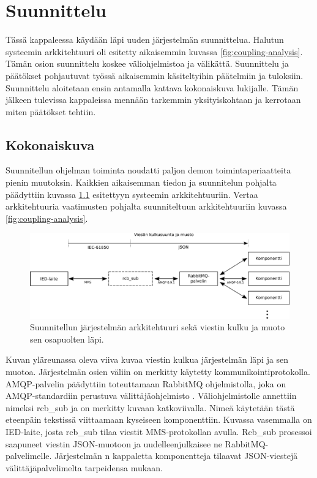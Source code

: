 \chapter{Suunnittelu}
\label{ch:suunnittelu}
Tässä kappaleessa käydään läpi uuden järjestelmän suunnittelua. Halutun systeemin arkkitehtuuri oli esitetty aikaisemmin kuvassa \ref{fig:coupling-analysis}. Tämän osion suunnittelu koskee väliohjelmistoa ja välikättä. Suunnittelu ja päätökset pohjautuvat työssä aikaisemmin käsiteltyihin päätelmiin ja tuloksiin. Suunnittelu aloitetaan ensin antamalla kattava kokonaiskuva lukijalle. Tämän jälkeen tulevissa kappaleissa mennään tarkemmin yksityiskohtaan ja kerrotaan miten päätökset tehtiin.



\section{Kokonaiskuva}
Suunnitellun ohjelman toiminta noudatti paljon demon toimintaperiaatteita pienin muutoksin. Kaikkien aikaisemman tiedon ja suunnitelun pohjalta päädyttiin kuvassa \ref{fig:planned-system-architecture} esitettyyn systeemin arkkitehtuuriin. Vertaa arkkitehtuuria vaatimusten pohjalta suunniteltuun arkkitehtuuriin kuvassa \ref{fig:coupling-analysis}.

\begin{figure}[ht!]
	\includegraphics[width=1\textwidth]{pictures/planned-system-architecture.png}
	\caption{Suunnitellun järjestelmän arkkitehtuuri sekä viestin kulku ja muoto sen osapuolten läpi.}
	\label{fig:planned-system-architecture}
\end{figure}

Kuvan yläreunassa oleva viiva kuvaa viestin kulkua järjestelmän läpi ja sen muotoa. Järjestelmän osien väliin on merkitty käytetty kommunikointiprotokolla. AMQP-palvelin päädyttiin toteuttamaan RabbitMQ ohjelmistolla, joka on AMQP-standardiin perustuva välittäjäohjelmisto \cite{rabbitmq-homepage}. Väliohjelmistolle annettiin nimeksi rcb\_sub ja on merkitty kuvaan katkoviivalla. Nimeä käytetään tästä eteenpäin tekstissä viittaamaan kyseiseen komponenttiin. Kuvassa vasemmalla on IED-laite, josta rcb\_sub tilaa viestit MMS-protokollan avulla. Rcb\_sub prosessoi saapuneet viestin JSON-muotoon ja uudelleenjulkaisee ne RabbitMQ-palvelimelle. Järjestelmän n kappaletta komponentteja tilaavat JSON-viestejä välittäjäpalvelimelta tarpeidensa mukaan.

